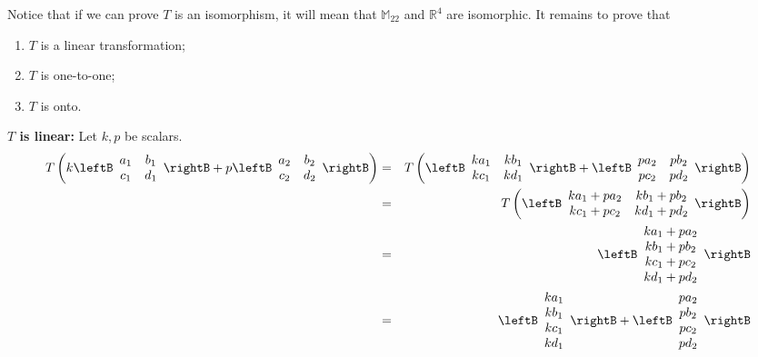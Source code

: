 \begin{solution}
Notice that if we can prove $T$ is an isomorphism, it will mean that $\mathbb{M}_{22}$ and $\mathbb{R}^4$ are isomorphic.
It remains to prove that 
\begin{enumerate}
\item $T$ is a linear transformation;
\item $T$ is one-to-one;
\item $T$ is onto.
\end{enumerate}

\textbf{$T$ is linear:}
Let $k,p$ be scalars.
\begin{eqnarray*}
T \left( k \leftB\begin{array}{cc} a_1 & b_1 \\ c_1 & d_1 \end{array}\rightB +  p \leftB\begin{array}{cc} a_2 & b_2 \\ c_2 & d_2 \end{array}\rightB \right) 
&=& T \left(  \leftB\begin{array}{cc} k a_1 & k b_1 \\ k c_1 & k d_1 \end{array}\rightB +  \leftB\begin{array}{cc} p a_2 & p b_2 \\ p c_2 & p d_2 \end{array}\rightB \right) \\
&=& T \left(  \leftB\begin{array}{cc} k a_1 + p a_2 & k b_1 + p b_2 \\ k c_1 + p c_2& k d_1 + p d_2 \end{array}\rightB  \right) \\
&=& \leftB \begin{array}{c} k a_1 + p a_2 \\ k b_1 + p b_2 \\ k c_1 + p c_2 \\ k d_1 + p d_2 \end{array}\rightB  \\
&=& \leftB \begin{array}{c} k a_1 \\ k b_1 \\ k c_1 \\ k d_1 \end{array} \rightB + \leftB \begin{array}{c} p a_2 \\ p b_2 \\ p c_2 \\ p d_2 \end{array} \rightB \\

\end{eqnarray*}
\end{solution}
